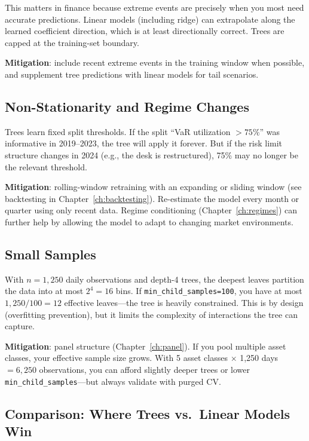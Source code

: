 This matters in finance because extreme events are precisely when you most need accurate predictions.
Linear models (including ridge) can extrapolate along the learned coefficient direction, which is at least directionally correct.
Trees are capped at the training-set boundary.

\textbf{Mitigation}: include recent extreme events in the training window when possible, and supplement tree predictions with linear models for tail scenarios.

\subsection{Non-Stationarity and Regime Changes}

Trees learn fixed split thresholds.
If the split ``VaR utilization $> 75\%$'' was informative in 2019--2023, the tree will apply it forever.
But if the risk limit structure changes in 2024 (e.g., the desk is restructured), 75\% may no longer be the relevant threshold.

\textbf{Mitigation}: rolling-window retraining with an expanding or sliding window (see backtesting in Chapter~\ref{ch:backtesting}).
Re-estimate the model every month or quarter using only recent data.
Regime conditioning (Chapter~\ref{ch:regimes}) can further help by allowing the model to adapt to changing market environments.

\subsection{Small Samples}

With $n = 1{,}250$ daily observations and depth-4 trees, the deepest leaves partition the data into at most $2^4 = 16$ bins.
If \texttt{min\_child\_samples=100}, you have at most $1{,}250 / 100 = 12$ effective leaves---the tree is heavily constrained.
This is by design (overfitting prevention), but it limits the complexity of interactions the tree can capture.

\textbf{Mitigation}: panel structure (Chapter~\ref{ch:panel}).
If you pool multiple asset classes, your effective sample size grows.
With 5 asset classes $\times$ 1,250 days $= 6{,}250$ observations, you can afford slightly deeper trees or lower \texttt{min\_child\_samples}---but always validate with purged CV.

\subsection{Comparison: Where Trees vs.\ Linear Models Win}

